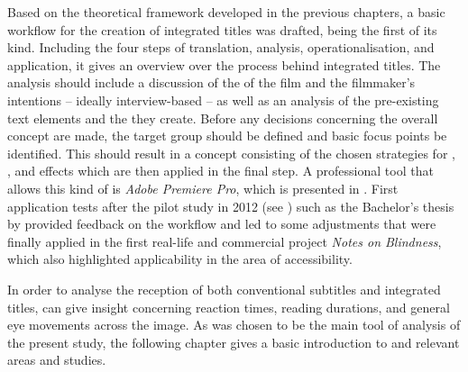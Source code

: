 Based on the theoretical framework developed in the previous chapters, a basic workflow for the creation of integrated titles was drafted, being the first of its kind. Including the four steps of translation, analysis, operationalisation, and application, it gives an overview over the process behind integrated titles. The analysis should include a discussion of the  of the film and the filmmaker’s intentions – ideally interview-based – as well as an analysis of the pre-existing text elements and the  they create. Before any decisions concerning the overall concept are made, the target group should be defined and basic focus points be identified. This should result in a concept consisting of the chosen strategies for , , and effects which are then applied in the final step. A professional tool that allows this kind of  is \textit{Adobe Premiere Pro}, which is presented in . First application tests after the pilot study in 2012 (see ) such as the Bachelor’s thesis by \citet{Hevesi2015} provided feedback on the workflow and led to some adjustments that were finally applied in the first real-life and commercial project \textit{Notes on Blindness}, which also highlighted applicability in the area of accessibility.

\largerpage
In order to analyse the reception of both conventional subtitles and integrated titles,  can give insight concerning reaction times, reading durations, and general eye movements across the image. As  was chosen to be the main tool of analysis of the present study, the following chapter gives a basic introduction to  and relevant  areas and studies.